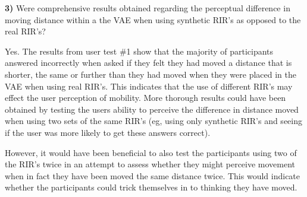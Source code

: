 \documentclass[../../main.tex]{subfiles}
\begin{document}



			\textbf{3)} Were comprehensive results obtained regarding the perceptual difference in moving distance within a the \ac{VAE} when using synthetic \ac{RIR}'s as opposed to the real \ac{RIR}'s?

				Yes. The results from user test \#1 show that the majority of participants answered incorrectly when asked if they felt they had moved a distance that is shorter, the same or further than they had moved when they were placed in the \ac{VAE} when using real \ac{RIR}'s. This indicates that the use of different \ac{RIR}'s may effect the user perception of mobility. More thorough results could have been obtained by testing the users ability to perceive the difference in distance moved when using two sets of the same \ac{RIR}'s (eg, using only synthetic \ac{RIR}'s and seeing if the user was more likely to get these answers correct).

				However, it would have been beneficial to also test the participants using two of the \ac{RIR}'s twice in an attempt to assess whether they might perceive movement when in fact they have been moved the same distance twice. This would indicate whether the participants could trick themselves in to thinking they have moved.%

		
\end{document}
